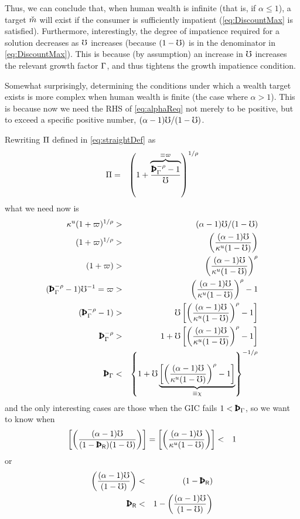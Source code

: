 \message{ !name(TractableBufferStock.tex)}\documentclass{handout}
\begin{document}
Thus, we can conclude that, when human wealth is infinite (that is, if $\alpha \leq 1$), a target $\check{m}$ will exist if the consumer is 
sufficiently impatient (\eqref{eq:DiscountMax} is satisfied).  Furthermore, interestingly, the degree of impatience required for a solution decreases as $\mho$ increases (because $(1-\mho)$ is in the denominator in \eqref{eq:DiscountMax}).  This is because (by assumption) an increase in $\mho$ increases the relevant growth factor $\Gamma$, and thus tightens the growth impatience condition.  

Somewhat surprisingly, determining the conditions under which a wealth target exists is more complex when human wealth is finite (the case where $\alpha > 1$).  This is because now we need the RHS of \eqref{eq:alphaReq} not merely to be positive, but to exceed a specific positive number, $(\alpha-1)\mho/(1-\mho)$.  

Rewriting $\Pi$ defined in \eqref{eq:straightDef} as 
\begin{eqnarray}
  \straight & = & \left(1+\overbrace{\frac{\PatPGro^{-\CRRA}-1}{\urate}}^{\equiv \varpi}\right)^{1/\CRRA} \label{eq:varpiDef}
\end{eqnarray}
what we need now is 
\begin{eqnarray}
    \MPCU (1+\varpi)^{1/\CRRA} & > & (\alpha-1)\urate/(1-\urate)
\\   (1+\varpi)^{1/\CRRA} & > & \left(\frac{(\alpha-1)\urate}{\MPCU (1-\urate)}\right)
\\   (1+\varpi) & > & \left(\frac{(\alpha-1)\urate}{\MPCU (1-\urate)}\right)^{\CRRA}
\\  (\PatPGro^{-\CRRA}-1)\urate^{-1} = \varpi & > & \left(\frac{(\alpha-1)\urate}{\MPCU (1-\urate)}\right)^{\CRRA}-1
\\  (\PatPGro^{-\CRRA}-1) & > & \urate \left[\left(\frac{(\alpha-1)\urate}{\MPCU (1-\urate)}\right)^{\CRRA}-1\right]
\\  \PatPGro^{-\CRRA} & > & 1  + \urate \left[\left(\frac{(\alpha-1)\urate}{\MPCU (1-\urate)}\right)^{\CRRA}-1\right]
\\  \PatPGro & < & \left\{1  + \urate \underbrace{\left[\left(\frac{(\alpha-1)\urate}{\MPCU (1-\urate)}\right)^{\CRRA}-1\right]}_{\equiv \chi} \right\}^{-1/\CRRA}
\end{eqnarray}
and the only interesting cases are those when the GIC fails $1 < \PatPGro$, so we want to know when 
\begin{eqnarray}
  \left[\left(\frac{(\alpha-1)\urate}{(1-\PatR) (1-\urate)}\right)\right] = \left[\left(\frac{(\alpha-1)\urate}{\MPCU (1-\urate)}\right)\right] & < & 1
\end{eqnarray}
or 
\begin{eqnarray}
    \left(\frac{(\alpha-1)\urate}{ (1-\urate)}\right)  & < & (1-\PatR)
\\  \PatR & < & 1-\left(\frac{(\alpha-1)\urate}{ (1-\urate)}\right)
\end{eqnarray}
\end{document}
